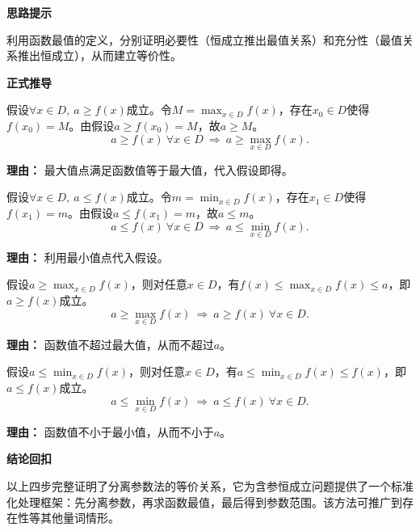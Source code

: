 \begin{proofbox}

	\textbf{\textcolor{CProof}{思路提示}}

	利用函数最值的定义，分别证明必要性（恒成立推出最值关系）和充分性（最值关系推出恒成立），从而建立等价性。

	\medskip
	\textbf{\textcolor{CProof}{正式推导}}
	\begin{description}[style=nextline, leftmargin=2.8em, labelsep=0.5em, itemsep=0.55em]
		\item[\textbf{步骤一（必要性上界）：}] 假设$\forall x\in D,\ a \ge f(x)$成立。令$M=\max_{x\in D} f(x)$，存在$x_0\in D$使得$f(x_0)=M$。由假设$a\ge f(x_0)=M$，故$a\ge M$。
			\[
				a\ge f(x)\ \forall x\in D\ \Rightarrow\ a\ge \max_{x\in D} f(x).
			\]
			\par\textbf{理由：} 最大值点满足函数值等于最大值，代入假设即得。

		\item[\textbf{步骤二（必要性下界）：}] 假设$\forall x\in D,\ a \le f(x)$成立。令$m=\min_{x\in D} f(x)$，存在$x_1\in D$使得$f(x_1)=m$。由假设$a\le f(x_1)=m$，故$a\le m$。
			\[
				a\le f(x)\ \forall x\in D\ \Rightarrow\ a\le \min_{x\in D} f(x).
			\]
			\par\textbf{理由：} 利用最小值点代入假设。

		\item[\textbf{步骤三（充分性上界）：}] 假设$a\ge \max_{x\in D} f(x)$，则对任意$x\in D$，有$f(x)\le \max_{x\in D} f(x)\le a$，即$a\ge f(x)$成立。
			\[
				a\ge \max_{x\in D} f(x)\ \Rightarrow\ a\ge f(x)\ \forall x\in D.
			\]
			\par\textbf{理由：} 函数值不超过最大值，从而不超过$a$。

		\item[\textbf{步骤四（充分性下界）：}] 假设$a\le \min_{x\in D} f(x)$，则对任意$x\in D$，有$a\le \min_{x\in D} f(x)\le f(x)$，即$a\le f(x)$成立。
			\[
				a\le \min_{x\in D} f(x)\ \Rightarrow\ a\le f(x)\ \forall x\in D.
			\]
			\par\textbf{理由：} 函数值不小于最小值，从而不小于$a$。
	\end{description}

	\medskip
	\textbf{\textcolor{CProof}{结论回扣}}

	以上四步完整证明了分离参数法的等价关系，它为含参恒成立问题提供了一个标准化处理框架：先分离参数，再求函数最值，最后得到参数范围。该方法可推广到存在性等其他量词情形。
\end{proofbox}
